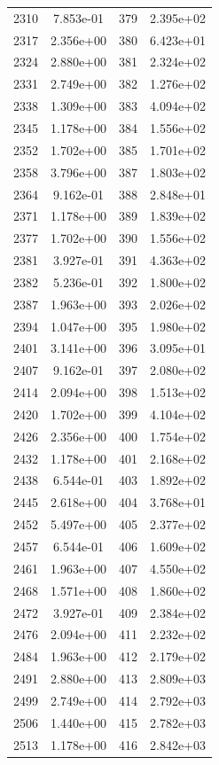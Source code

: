 \documentclass[12pt]{article}
\begin{document}
\begin{longtable}{@{}cccc@{}}
2310 & 7.853e-01 & 379 & 2.395e+02 \\
2317 & 2.356e+00 & 380 & 6.423e+01 \\
2324 & 2.880e+00 & 381 & 2.324e+02 \\
2331 & 2.749e+00 & 382 & 1.276e+02 \\
2338 & 1.309e+00 & 383 & 4.094e+02 \\
2345 & 1.178e+00 & 384 & 1.556e+02 \\
2352 & 1.702e+00 & 385 & 1.701e+02 \\
2358 & 3.796e+00 & 387 & 1.803e+02 \\
2364 & 9.162e-01 & 388 & 2.848e+01 \\
2371 & 1.178e+00 & 389 & 1.839e+02 \\
2377 & 1.702e+00 & 390 & 1.556e+02 \\
2381 & 3.927e-01 & 391 & 4.363e+02 \\
2382 & 5.236e-01 & 392 & 1.800e+02 \\
2387 & 1.963e+00 & 393 & 2.026e+02 \\
2394 & 1.047e+00 & 395 & 1.980e+02 \\
2401 & 3.141e+00 & 396 & 3.095e+01 \\
2407 & 9.162e-01 & 397 & 2.080e+02 \\
2414 & 2.094e+00 & 398 & 1.513e+02 \\
2420 & 1.702e+00 & 399 & 4.104e+02 \\
2426 & 2.356e+00 & 400 & 1.754e+02 \\
2432 & 1.178e+00 & 401 & 2.168e+02 \\
2438 & 6.544e-01 & 403 & 1.892e+02 \\
2445 & 2.618e+00 & 404 & 3.768e+01 \\
2452 & 5.497e+00 & 405 & 2.377e+02 \\
2457 & 6.544e-01 & 406 & 1.609e+02 \\
2461 & 1.963e+00 & 407 & 4.550e+02 \\
2468 & 1.571e+00 & 408 & 1.860e+02 \\
2472 & 3.927e-01 & 409 & 2.384e+02 \\
2476 & 2.094e+00 & 411 & 2.232e+02 \\
2484 & 1.963e+00 & 412 & 2.179e+02 \\
2491 & 2.880e+00 & 413 & 2.809e+03 \\
2499 & 2.749e+00 & 414 & 2.792e+03 \\
2506 & 1.440e+00 & 415 & 2.782e+03 \\
2513 & 1.178e+00 & 416 & 2.842e+03 \\

\end{longtable}
\end{document}
